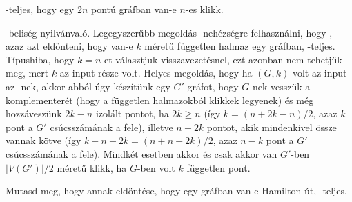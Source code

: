 \begin{Exercise}[counter={sorszam}, difficulty=0]
	\NP-teljes, hogy egy $2n$ pont\'u gr\'afban van-e $n$-es klikk.
\end{Exercise}	
\begin{Answer}
	\NP-belis\'eg nyilv\'anval\'o.
	Legegyszer\H ubb megold\'as \NP-neh\'ezs\'egre felhaszn\'alni, hogy , azaz azt eld\"onteni, hogy van-e $k$ m\'eret\H u f\"uggetlen halmaz egy gr\'afban, \NP-teljes. T\'ipushiba, hogy $k=n$-et v\'alasztjuk visszavezet\'esnel, ezt azonban nem tehetj\"uk meg, mert $k$ az input r\'esze volt. Helyes megold\'as, hogy ha $(G,k)$ volt az input az -nek, akkor abb\'ol \'ugy k\'esz\'it\"unk egy $G'$ gr\'afot, hogy $G$-nek vessz\"uk a komplementer\'et (hogy a f\"uggetlen halmazokb\'ol klikkek legyenek) \'es m\'eg hozz\'avesz\"unk $2k-n$ izol\'alt pontot, ha $2k\ge n$ (\'igy $k=(n+2k-n)/2$, azaz $k$ pont a $G'$ cs\'ucssz\'am\'anak a fele), illetve $n-2k$ pontot, akik mindenkivel \"ossze vannak k\"otve (\'igy $k+n-2k=(n+n-2k)/2$, azaz $n-k$ pont a $G'$ cs\'ucssz\'am\'anak a fele). Mindk\'et esetben akkor \'es csak akkor van $G'$-ben $|V(G')|/2$ m\'eret\H u klikk, ha $G$-ben volt $k$ f\"uggetlen pont.
\end{Answer}


\begin{Exercise}[counter={sorszam}, difficulty=1]
	Mutasd meg, hogy annak eld\"ont\'ese, hogy egy gr\'afban van-e Hamilton-\'ut, \NP-teljes.
\end{Exercise}	

